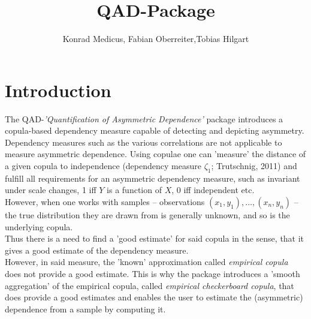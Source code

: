 \documentclass{scrartcl}\usepackage[]{graphicx}\usepackage[]{color}
\author{Konrad Medicus, Fabian Oberreiter,Tobias Hilgart}
\begin{document}
\title{QAD-Package}

\maketitle

\section{Introduction}

The QAD-\textit{'Quantification of Asymmetric Dependence'} package introduces a copula-based dependency measure capable of detecting and depicting asymmetry.\\
Dependency measures such as the various correlations are not applicable to measure asymmetric dependence. Using copulae one can 'measure' the distance of a given copula to independence (dependency measure $\zeta_1$; Trutschnig, 2011) and fulfill all requirements for an asymmetric dependency measure, such as invariant under scale changes, 1 iff $Y$ is a function of $X$, 0 iff independent etc.\\
However, when one works with samples -- observations $(x_1,y_1),\dots,(x_n,y_n)$ -- the true distribution they are drawn from is generally unknown, and so is the underlying copula.\\
Thus there is a need to find a 'good estimate' for said copula in the sense, that it gives a good estimate of the dependency measure.\\
However, in said measure, the 'known' approximation called \textit{empirical copula} does not provide a good estimate. This is why the package introduces a 'smooth aggregation' of the empirical copula, called \textit{empirical checkerboard copula}, that does provide a good estimates and enables the user to estimate the (asymmetric) dependence from a sample by computing it.
\end{document}

